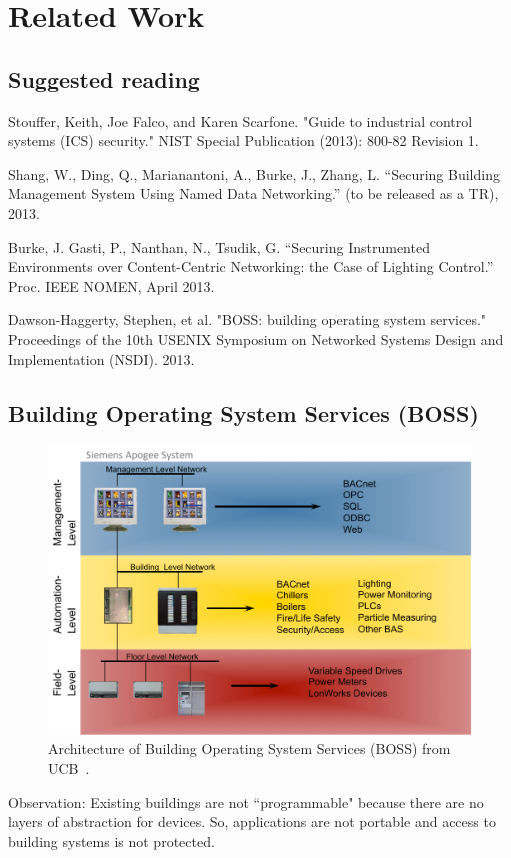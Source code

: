 \section{Related Work}


\subsection{Suggested reading}

Stouffer, Keith, Joe Falco, and Karen Scarfone. "Guide to industrial control systems (ICS) security." NIST Special Publication (2013): 800-82 Revision 1.

Shang, W., Ding, Q., Marianantoni, A., Burke, J., Zhang, L. “Securing Building Management System Using Named Data Networking.”  (to be 
released as a TR), 2013. 

Burke, J. Gasti, P., Nanthan, N., Tsudik, G. “Securing Instrumented Environments over Content-Centric Networking: the Case of Lighting Control.”  Proc. IEEE NOMEN, April 2013. 

Dawson-Haggerty, Stephen, et al. "BOSS: building operating system services." Proceedings of the 10th USENIX Symposium on Networked Systems Design and Implementation (NSDI). 2013.

\subsection{Building Operating System Services (BOSS)} 

\begin{figure}
\begin{center}
\includegraphics[width=.6\textwidth]{figures/siemens-apogee-levels}
\caption{Architecture of Building Operating System Services (BOSS) from UCB~\cite{Dawson-Haggerty2013BOSS}.} 
\label{fig:BOSS}
\end{center}
\end{figure}

Observation:  Existing buildings are not ``programmable" because there are no layers of abstraction for devices.  So, applications are not portable and access to building systems is not protected.

